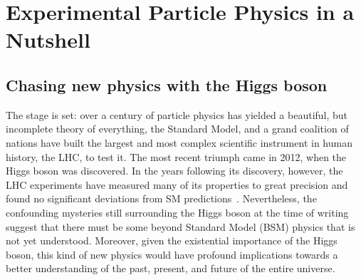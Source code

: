 \chapter{Experimental Particle Physics in a Nutshell}

\section{Chasing new physics with the Higgs boson}
The stage is set: over a century of particle physics has yielded a beautiful, but incomplete theory of everything, the Standard Model, and a grand coalition of nations have built the largest and most complex scientific instrument in human history, the LHC, to test it. 
The most recent triumph came in 2012, when the Higgs boson was discovered. 
In the years following its discovery, however, the LHC experiments have measured many of its properties to great precision and found no significant deviations from SM predictions~\cite{NatureHiggsCMS2022, NatureHiggsATLAS2022}. 
Nevertheless, the confounding mysteries still surrounding the Higgs boson at the time of writing suggest that there must be some beyond Standard Model (BSM) physics that is not yet understood. 
Moreover, given the existential importance of the Higgs boson, this kind of new physics would have profound implications towards a better understanding of the past, present, and future of the entire universe. 

